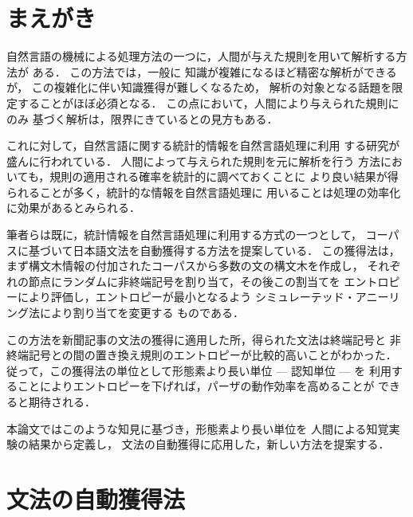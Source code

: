 


\maketitle

\section{まえがき}

自然言語の機械による処理方法の一つに，人間が与えた規則を用いて解析する方法が
ある．
この方法では，一般に
知識が複雑になるほど精密な解析ができるが，
この複雑化に伴い知識獲得が難しくなるため，
解析の対象となる話題を限定することがほぼ必須となる．
この点において，人間により与えられた規則にのみ
基づく解析は，限界にきているとの見方もある．

これに対して，自然言語に関する統計的情報を自然言語処理に利用
する研究が盛んに行われている\cite{utsu,kudo,mich}．
人間によって与えられた規則を元に解析を行う
方法においても，規則の適用される確率を統計的に調べておくことに
より良い結果が得られることが多く，統計的な情報を自然言語処理に
用いることは処理の効率化に効果があるとみられる．

筆者らは既に，統計情報を自然言語処理に利用する方式の一つとして，
コーパスに基づいて日本語文法を自動獲得する方法を提案している\cite{yoko2}．
この獲得法は，まず構文木情報の付加されたコーパスから多数の文の構文木を作成し，
それぞれの節点にランダムに非終端記号を割り当て，その後この割当てを
エントロピーにより評価し，エントロピーが最小となるよう
シミュレーテッド・アニーリング法により割り当てを変更する
ものである\cite{shan,asai,patr}．

この方法を新聞記事の文法の獲得に適用した所，得られた文法は終端記号と
非終端記号との間の置き換え規則のエントロピーが比較的高いことがわかった．
従って，この獲得法の単位として形態素より長い単位 --- 認知単位 --- を
利用することによりエントロピーを下げれば，パーザの動作効率を高めることが
できると期待される．


本論文ではこのような知見に基づき，形態素より長い単位を
人間による知覚実験の結果から定義し，
文法の自動獲得に応用した，新しい方法を提案する．


\section{文法の自動獲得法}

